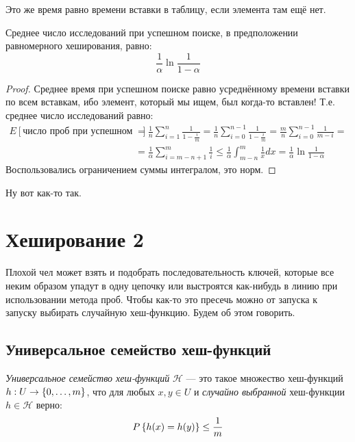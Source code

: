 Это же время равно времени вставки в таблицу, если элемента там ещё нет.
\begin{thm}
Среднее число исследований при успешном поиске, в предположении равномерного хеширования, равно:
\[
    \frac{1}{\alpha}\ln{\frac{1}{1 - \alpha}}
\]
\end{thm}
\begin{proof}
Среднее время при успешном поиске равно усреднённому времени вставки по всем вставкам, ибо элемент, который мы ищем, был когда-то вставлен! Т.е. среднее число исследований равно:
\begin{align*}
    E[\text{число проб при успешном поиске}] &= \frac{1}{n}\sum_{i = 1}^{n}{\frac{1}{1 - \frac{i}{m}}} = \frac{1}{n}\sum_{i = 0}^{n-1}{\frac{1}{1 - \frac{i}{m}}} = \frac{m}{n}\sum_{i = 0}^{n-1}{\frac{1}{m - i}} =\\
    &= \frac{1}{\alpha}\sum_{i = m-n+1}^{m}{\frac{1}{i}} \leq \frac{1}{\alpha}\int_{m-n}^{m}{\frac{1}{x}dx} = \frac{1}{\alpha}\ln{\frac{1}{1 - \alpha}}
\end{align*}
Воспользовались ограничением суммы интегралом, это норм.
\end{proof}
Ну вот как-то так.

\section{Хеширование 2}
Плохой чел может взять и подобрать последовательность ключей, которые все неким образом упадут в одну цепочку или выстроятся как-нибудь в линию при использовании метода проб. Чтобы как-то это пресечь можно от запуска к запуску выбирать случайную хеш-функцию. Будем об этом говорить.

\subsection{Универсальное семейство хеш-функций}
\begin{defn}
\emph{Универсальное семейство хеш-функций} $\mathcal{H}$ --- это такое множество хеш-функций $h: U \to \left\lbrace 0,\ldots,m \right\rbrace$, что для любых $x,y \in U$ и \emph{случайно выбранной} хеш-функции $h \in \mathcal{H}$ верно:
\[
    P\left\lbrace h(x) = h(y) \right\rbrace \leq \frac{1}{m}
\]
\end{defn}

